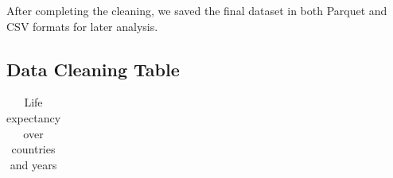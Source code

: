 \documentclass[
  letterpaper,
  DIV=11,
  numbers=noendperiod]{scrartcl}
\begin{document}
After completing the cleaning, we saved the final dataset in both
Parquet and CSV formats for later analysis.

\subsection{Data Cleaning Table}\label{data-cleaning-table}

\begin{longtable}[]{@{}
  >{\raggedright\arraybackslash}p{}
  >{\raggedright\arraybackslash}p{}
  >{\raggedright\arraybackslash}p{}
  >{\raggedright\arraybackslash}p{}
  >{\raggedright\arraybackslash}p{}
  >{\raggedright\arraybackslash}p{}
  >{\raggedright\arraybackslash}p{}@{}}

\caption{\label{tbl-cleaned_leab}Life expectancy over countries and
years}

\tabularnewline


\end{longtable}
\end{document}
